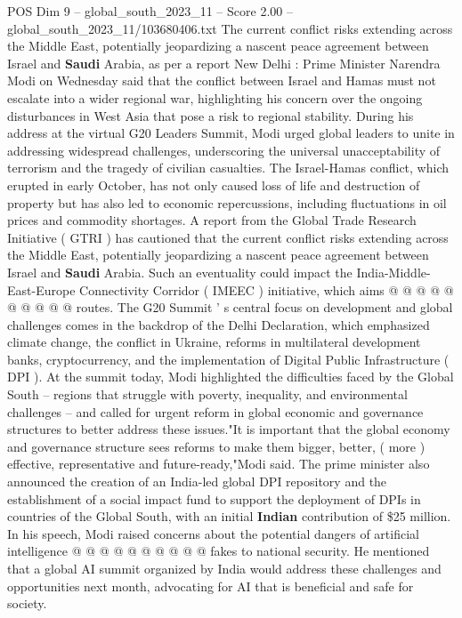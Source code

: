 \begin{textsample}{POS Dim 9 – global\_south\_2023\_11 – Score 2.00 – global\_south\_2023\_11/103680406.txt}  \label{ex:f9_pos_131}
The current conflict risks extending across the Middle East, potentially jeopardizing a nascent peace agreement between Israel and \textbf{Saudi} Arabia, as per a report New Delhi : Prime Minister Narendra Modi on Wednesday said that the conflict between Israel and Hamas must not escalate into a wider regional war, highlighting his concern over the ongoing disturbances in West Asia that pose a risk to regional stability.
During his address at the virtual G20 Leaders Summit, Modi urged global leaders to unite in addressing widespread challenges, underscoring the universal unacceptability of terrorism and the tragedy of civilian casualties.
The Israel-Hamas conflict, which erupted in early October, has not only caused loss of life and destruction of property but has also led to economic repercussions, including fluctuations in oil prices and commodity shortages.
A report from the Global Trade Research Initiative ( GTRI ) has cautioned that the current conflict risks extending across the Middle East, potentially jeopardizing a nascent peace agreement between Israel and \textbf{Saudi} Arabia.
Such an eventuality could impact the India-Middle-East-Europe Connectivity Corridor ( IMEEC ) initiative, which aims @ @ @ @ @ @ @ @ @ @ routes.
The G20 Summit ' s central focus on development and global challenges comes in the backdrop of the Delhi Declaration, which emphasized climate change, the conflict in Ukraine, reforms in multilateral development banks, cryptocurrency, and the implementation of Digital Public Infrastructure ( DPI ).
At the summit today, Modi highlighted the difficulties faced by the Global South -- regions that struggle with poverty, inequality, and environmental challenges -- and called for urgent reform in global economic and governance structures to better address these issues."It is important that the global economy and governance structure sees reforms to make them bigger, better, ( more ) effective, representative and future-ready,"Modi said.
The prime minister also announced the creation of an India-led global DPI repository and the establishment of a social impact fund to support the deployment of DPIs in countries of the Global South, with an initial \textbf{Indian} contribution of \$25 million.
In his speech, Modi raised concerns about the potential dangers of artificial intelligence @ @ @ @ @ @ @ @ @ @ fakes to national security.
He mentioned that a global AI summit organized by India would address these challenges and opportunities next month, advocating for AI that is beneficial and safe for society.

\end{textsample}
